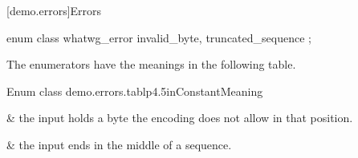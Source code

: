 [demo.errors]{Errors}

%
\begin{itemdecl}
enum class whatwg_error { invalid_byte, truncated_sequence };
\end{itemdecl}

\begin{itemdescr}
\pnum
\remarks
The enumerators have the meanings in the following table.
\begin{libtab2}{Enum class }{demo.errors.tab}{lp{4.5in}}{Constant}{Meaning}

 &
the input holds a byte the encoding does not allow in that position. \\
\rowsep

 &
the input ends in the middle of a sequence. \\
\end{libtab2}
\end{itemdescr}
